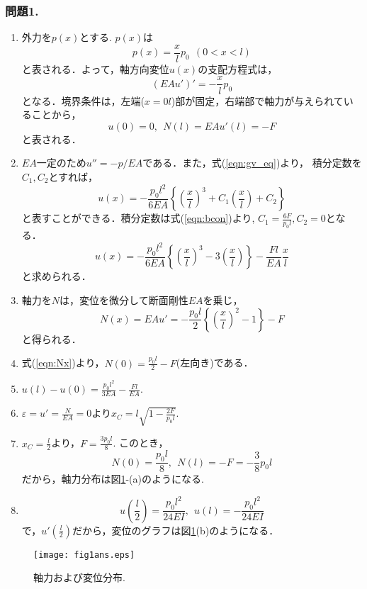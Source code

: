 \documentclass[10pt,a4j]{jarticle}
\begin{document}
\subsubsection*{問題1.}
\begin{enumerate}
\item
	外力を$p(x)$とする. $p(x)$は
	\begin{equation}
		p(x)=\frac{x}{l}p_0 
		\ \ \left(0 < x < l \right)
		\label{eqn:px}
	\end{equation}
	と表される．よって，軸方向変位$u(x)$の支配方程式は，
	\begin{equation}
		\left( EAu' \right)'=-\frac{x}{l}p_0
		\label{eqn:gv_eq}
	\end{equation}
	となる．境界条件は，左端($x=0l$)部が固定，右端部で軸力が与えられていることから，
	\begin{equation}
		u(0)=0, \ \  N(l)=EAu'(l)=-F
		\label{eqn:bcon}
	\end{equation}
	と表される．
\item
	$EA$一定のため$u''=-p/EA$である．また，式(\ref{eqn:gv_eq})より，
	積分定数を$C_1, C_2$とすれば，
	\begin{equation}
		u(x)=-\frac{p_0l^2}{6EA}\left\{
			\left( \frac{x}{l}\right)^3
			+
			C_1\left( \frac{x}{l}\right)
			+
			C_2
		\right\}
	\end{equation}
		と表すことができる．積分定数は式(\ref{eqn:bcon})より, $C_1=\frac{6F}{p_0l}, C_2=0$となる．
	\begin{equation}
		u(x)=-\frac{p_0l^2}{6EA}\left\{
			\left( \frac{x}{l}\right)^3
			-
			3
			\left( \frac{x}{l}\right)
		\right\}
		-\frac{Fl}{EA}\frac{x}{l}
		\label{eqn:ux}
	\end{equation}
	と求められる．
\item
	軸力を$N$は，変位を微分して断面剛性$EA$を乗じ，
	\begin{equation}
		N(x)=EAu'=-\frac{p_0l}{2}
			\left\{
			\left(\frac{x}{l}\right)^2 -1
			\right\}
			-F
		\label{eqn:Nx}
	\end{equation}
	と得られる．
\item
	式(\ref{eqn:Nx})より，$N(0)=\frac{p_0l}{2}-F$(左向き)である．
\item
	$u(l)-u(0)=\frac{p_0l^2}{3EA}-\frac{Fl}{EA}$.
\item
	$\varepsilon=u'=\frac{N}{EA}=0$より$x_C=l\sqrt{1-\frac{2F}{p_0l}}$.
\item
	$x_C=\frac{l}{2}$より，$F=\frac{3p_0l}{8}$. このとき，
	\[
		N(0)=\frac{p_0l}{8}, \ \ N(l)=-F=-\frac{3}{8}p_0l
	\]
	だから，軸力分布は図\ref{fig:fig1}-(a)のようになる.
\item
	\[
		u\left(\frac{l}{2}\right)=\frac{p_0l^2}{24EI}, \ \ 
		u\left(l \right)=-\frac{p_0l^2}{24EI}
	\]
	で，$u'(\frac{l}{2})$だから，変位のグラフは図\ref{fig:fig1}(b)のようになる．
\end{enumerate}
\begin{figure}
	\begin{center}
	\texttt{[image: fig1ans.eps]} 
	\end{center}
	\caption{軸力および変位分布.} 
	\label{fig:fig1}
\end{figure}
\newpage
\end{document}
